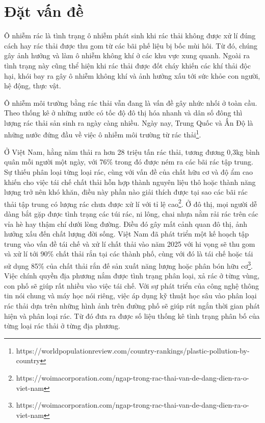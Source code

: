 \documentclass[../the.tex]{subfiles}
\begin{document}
\section{Đặt vấn đề}
\label{tong_quan}

{\fontsize{13}{12} \selectfont

Ô nhiễm rác là tình trạng ô nhiễm phát sinh khi rác thải không được xử lí đúng cách hay rác thải được thu gom từ các bãi phế liệu bị bốc mùi hôi. Từ đó, chúng gây ảnh hưởng và làm ô nhiễm không khí ở các khu vực xung quanh. Ngoài ra tình trạng này cũng thể hiện khi rác thải được đốt cháy khiến các khí thải độc hại, khói bay ra gây ô nhiễm không khí và ảnh hưởng xấu tới sức khỏe con người, hệ động, thực vật.

}

\bigskip

{\fontsize{13}{12} \selectfont

Ô nhiễm môi trường bằng rác thải vẫn đang là vấn đề gây nhức nhối ở toàn cầu. Theo thống kê ở những nước có tốc độ đô thị hóa nhanh và dân số đông thì lượng rác thải sản sinh ra ngày càng nhiều. Ngày nay, Trung Quốc và Ấn Độ là những nước đứng đầu về việc ô nhiễm môi trường từ rác thải\footnote[1]{https://worldpopulationreview.com/country-rankings/plastic-pollution-by-country}.

}

\bigskip

{\fontsize{13}{12} \selectfont

Ở Việt Nam, hằng năm thải ra hơn 28 triệu tấn rác thải, tương đương 0,3kg bình quân mỗi người một ngày, với 76\% trong đó được ném ra các bãi rác tập trung. Sự thiếu phân loại từng loại rác, cùng với vấn đề của chất hữu cơ và độ ẩm cao khiến cho việc tái chế chất thải hỗn hợp thành nguyên liệu thô hoặc thành năng lượng trở nên khó khăn, điều này phần nào giải thích được tại sao các bãi rác thải tập trung có lượng rác chưa được xử lí với tỉ lệ cao\footnote[2]{https://woimacorporation.com/ngap-trong-rac-thai-van-de-dang-dien-ra-o-viet-nam}. Ở đô thị, mọi người dễ dàng bắt gặp được tình trạng các túi rác, ni lông, chai nhựa nằm rải rác trên các vỉa hè hay thậm chí dưới lòng đường. Điều đó gây mất cảnh quan đô thị, ảnh hưởng xấu đến chất lượng đời sống. Việt Nam đã phát triển một kế hoạch tập trung vào vấn đề tái chế và xử lí chất thải vào năm 2025 với hi vọng sẽ thu gom và xử lí tới 90\% chất thải rắn tại các thành phố, cùng với đó là tái chế hoặc tái sử dụng 85\% của chất thải rắn đế sản xuất năng lượng hoặc phân bón hữu cơ\footnote[3]{https://woimacorporation.com/ngap-trong-rac-thai-van-de-dang-dien-ra-o-viet-nam}. Việc chính quyền địa phương nắm được tình trạng phân loại, xả rác ở từng vùng, con phố sẽ giúp rất nhiều vào việc tái chế. Với sự phát triển của công nghệ thông tin nói chung và máy học nói riêng, việc áp dụng kỹ thuật học sâu vào phân loại rác thải dựa trên những hình ảnh trên đường phố sẽ giúp rút ngắn thời gian phát hiện và phân loại rác. Từ đó đưa ra được số liệu thống kê tình trạng phân bố của từng loại rác thải ở từng địa phương.

}
\end{document}
